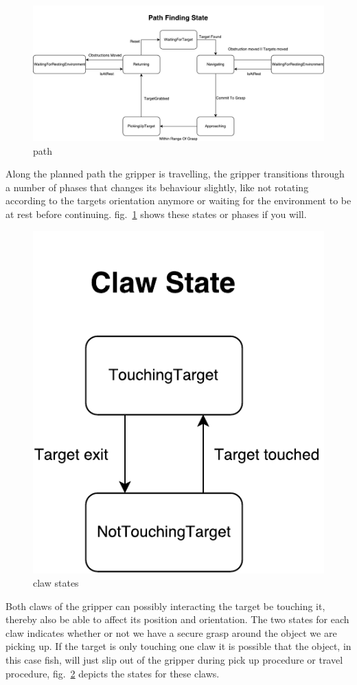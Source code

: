 \begin{figure}
\centering
\includegraphics[width=\linewidth]{figures/statediagrams/path.pdf}
\caption{path}
\label{fig:path}
\end{figure}

Along the planned path the gripper is travelling, the gripper transitions through a number of phases that changes its behaviour slightly, like not rotating according to the targets orientation anymore or waiting for the environment to be at rest before continuing. fig.~\ref{fig:path} shows these states or phases if you will.

\begin{figure}
\centering
\includegraphics[width=.3\linewidth]{figures/statediagrams/claw-states.pdf}
\caption{claw states}
\label{fig:claw}
\end{figure}

Both claws of the gripper can possibly interacting the target be touching it, thereby also be able to affect its position and orientation. The two states for each claw indicates whether or not we have a secure grasp around the object we are picking up. If the target is only touching one claw it is possible that the object, in this case fish, will just slip out of the gripper during pick up procedure or travel procedure, fig.~\ref{fig:claw} depicts the states for these claws.

